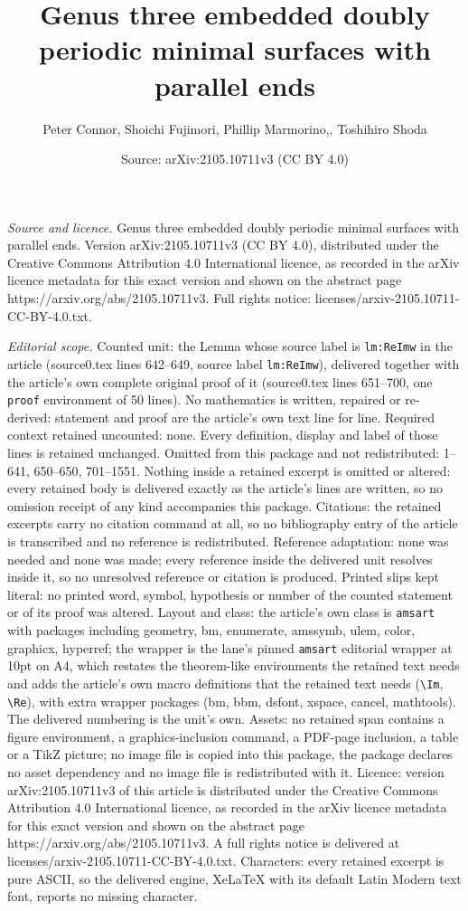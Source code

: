 \documentclass[10pt,a4paper]{amsart}
\title[Genus three embedded doubly periodic minimal surfaces with p]{Genus three embedded doubly periodic minimal surfaces with parallel ends}
\author{Peter Connor, Shoichi Fujimori, Phillip Marmorino,, Toshihiro Shoda}
\date{Source: arXiv:2105.10711v3 (CC BY 4.0)}
\begin{document}
\maketitle

\noindent\emph{Source and licence.} Genus three embedded doubly periodic minimal surfaces with parallel ends. Version arXiv:2105.10711v3 (CC BY 4.0), distributed under the Creative Commons Attribution 4.0 International licence, as recorded in the arXiv licence metadata for this exact version and shown on the abstract page https://arxiv.org/abs/2105.10711v3. Full rights notice: licenses/arxiv-2105.10711-CC-BY-4.0.txt.\par\smallskip

\noindent\textit{Editorial scope.} Counted unit: the Lemma whose source label is \texttt{lm:ReImw} in the article (source0.tex lines 642--649, source label \texttt{lm:ReImw}), delivered together with the article's own complete original proof of it (source0.tex lines 651--700, one \texttt{proof} environment of 50 lines). No mathematics is written, repaired or re-derived: statement and proof are the article's own text line for line. Required context retained uncounted: none. Every definition, display and label of those lines is retained unchanged. Omitted from this package and not redistributed: 1--641, 650--650, 701--1551. Nothing inside a retained excerpt is omitted or altered: every retained body is delivered exactly as the article's lines are written, so no omission receipt of any kind accompanies this package. Citations: the retained excerpts carry no citation command at all, so no bibliography entry of the article is transcribed and no reference is redistributed. Reference adaptation: none was needed and none was made; every reference inside the delivered unit resolves inside it, so no unresolved reference or citation is produced. Printed slips kept literal: no printed word, symbol, hypothesis or number of the counted statement or of its proof was altered. Layout and class: the article's own class is \texttt{amsart} with packages including geometry, bm, enumerate, amssymb, ulem, color, graphicx, hyperref; the wrapper is the lane's pinned \texttt{amsart} editorial wrapper at 10pt on A4, which restates the theorem-like environments the retained text needs and adds the article's own macro definitions that the retained text needs (\texttt{\textbackslash Im}, \texttt{\textbackslash Re}), with extra wrapper packages (bm, bbm, dsfont, xspace, cancel, mathtools). The delivered numbering is the unit's own. Assets: no retained span contains a figure environment, a graphics-inclusion command, a PDF-page inclusion, a table or a TikZ picture; no image file is copied into this package, the package declares no asset dependency and no image file is redistributed with it. Licence: version arXiv:2105.10711v3 of this article is distributed under the Creative Commons Attribution 4.0 International licence, as recorded in the arXiv licence metadata for this exact version and shown on the abstract page https://arxiv.org/abs/2105.10711v3. A full rights notice is delivered at licenses/arxiv-2105.10711-CC-BY-4.0.txt. Characters: every retained excerpt is pure ASCII, so the delivered engine, XeLaTeX with its default Latin Modern text font, reports no missing character.
\end{document}
